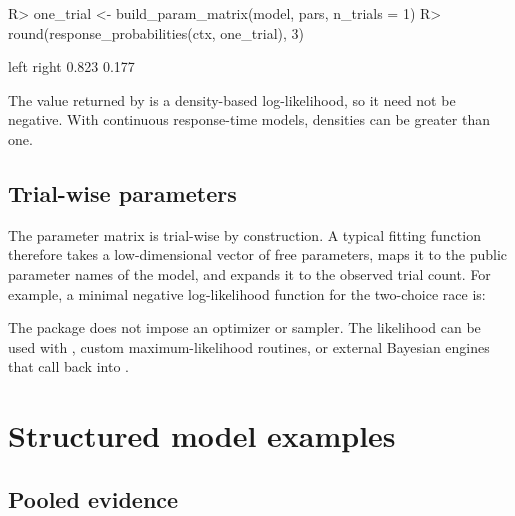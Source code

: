 \documentclass[article]{jss}
\newcommand{\fct}[1]{\code{#1()}}
\begin{document}
\begin{CodeChunk}
\begin{CodeInput}
R> one_trial <- build_param_matrix(model, pars, n_trials = 1)
R> round(response_probabilities(ctx, one_trial), 3)
\end{CodeInput}
\begin{CodeOutput}
 left right
0.823 0.177
\end{CodeOutput}
\end{CodeChunk}

The value returned by \fct{log\_likelihood} is a density-based log-likelihood,
so it need not be negative. With continuous response-time models, densities can
be greater than one.

\subsection{Trial-wise parameters}

The parameter matrix is trial-wise by construction. A typical fitting function
therefore takes a low-dimensional vector of free parameters, maps it to the
public parameter names of the model, and expands it to the observed trial
count. For example, a minimal negative log-likelihood
function for the two-choice race is:


The package does not impose an optimizer or sampler. The likelihood can be
used with \fct{optim}, custom maximum-likelihood routines, or external
Bayesian engines that call back into .

\section{Structured model examples}
\label{sec:examples}

\subsection{Pooled evidence}
\end{document}
